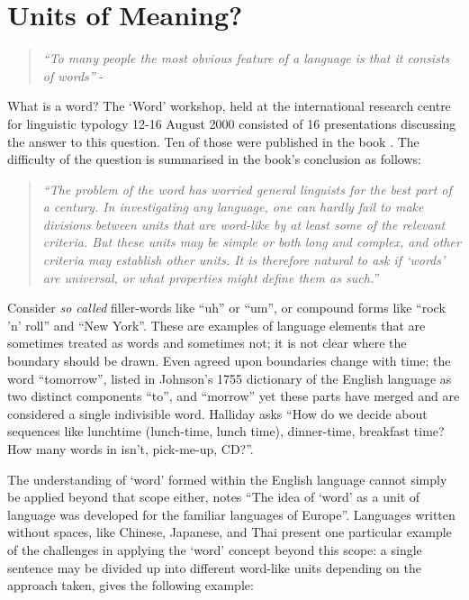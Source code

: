 \section{Units of Meaning?}
\begin{quote}
  \emph{``To many people the most obvious feature of a language is that it consists of words''} - \textcite{halliday-2004-lexicology}
\end{quote}

What is a word? The `Word' workshop, held at the international research centre for linguistic typology 12-16 August 2000 consisted of 16 presentations discussing the answer to this question. Ten of those were published in the book \smartcite{dixon02-word}. The difficulty of the question is summarised in the book's conclusion as follows:

\begin{quote}
\emph{``The problem of the word has worried general linguists for the best part of a century. In investigating any language, one can hardly fail to make divisions between units that are word-like by at least some of the relevant criteria. But these units may be simple or both long and complex, and other criteria may establish other units. It is therefore natural to ask if ‘words’ are universal, or what properties might define them as such.''}
\end{quote}

Consider \emph{so called} filler-words like ``uh'' or ``um'', or compound forms like ``rock 'n' roll'' and ``New York''. These are examples of language elements that are sometimes treated as words and sometimes not; it is not clear where the boundary should be drawn. Even agreed upon boundaries change with time; the word ``tomorrow'', listed in Johnson's 1755 dictionary of the English language as two distinct components ``to'', and ``morrow'' yet these parts have merged and are considered a single indivisible word. Halliday \smartcite{halliday-2004-lexicology} asks ``How do we decide about sequences like lunchtime (lunch-time, lunch time), dinner-time, breakfast time? How many words in isn't, pick-me-up, CD?''.

The understanding of `word' formed within the English language cannot simply be applied beyond that scope either, \cite{dixon02-word} notes ``The idea of ‘word’ as a unit of language was developed for the familiar languages of Europe''. Languages written without spaces, like Chinese, Japanese, and Thai present one particular example of the challenges in applying the `word' concept beyond this scope: a single sentence may be divided up into different word-like units depending on the approach taken,\textcite{chen-2017-adversarial-multi} gives the following example:

